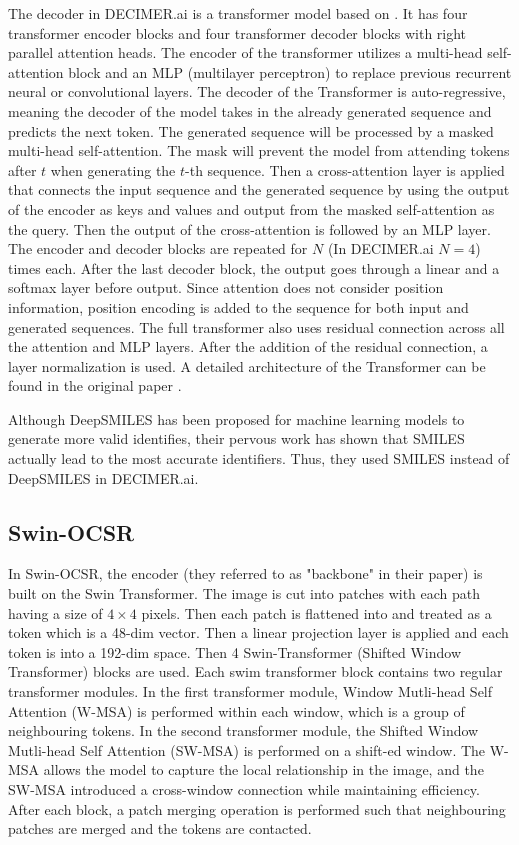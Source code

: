 \documentclass{article}
\begin{document}
The decoder in DECIMER.ai is a transformer model based on \autocite{attention_is_all_you_need}. It has four transformer encoder blocks and four transformer decoder blocks with right parallel attention heads. \autocite{decimer} The encoder of the transformer utilizes a multi-head self-attention block and an MLP (multilayer perceptron) to replace previous recurrent neural or convolutional layers. The decoder of the Transformer is auto-regressive, meaning the decoder of the model takes in the already generated sequence and predicts the next token. The generated sequence will be processed by a masked multi-head self-attention. The mask will prevent the model from attending tokens after $t$ when generating the $t$-th sequence. Then a cross-attention layer is applied that connects the input sequence and the generated sequence by using the output of the encoder as keys and values and output from the masked self-attention as the query. Then the output of the cross-attention is followed by an MLP layer. The encoder and decoder blocks are repeated for $N$ (In DECIMER.ai $N=4$) times each. After the last decoder block, the output goes through a linear and a softmax layer before output. Since attention does not consider position information, position encoding is added to the sequence for both input and generated sequences. The full transformer also uses residual connection across all the attention and MLP layers. After the addition of the residual connection, a layer normalization is used. A detailed architecture of the Transformer can be found in the original paper \autocite{attention_is_all_you_need}. 

Although DeepSMILES \cite{oboyle_deepsmiles:_2018} has been proposed for machine learning models to generate more valid identifies, their pervous work \cite{rajan_performance_2022} has shown that SMILES actually lead to the most accurate identifiers. Thus, they used SMILES instead of DeepSMILES in DECIMER.ai. \cite{decimer}  
\subsection{Swin-OCSR}
In Swin-OCSR, the encoder (they referred to as "backbone" in their paper) is built on the Swin Transformer. The image is cut into patches with each path having a size of $4 \times 4$ pixels. Then each patch is flattened into and treated as a token which is a 48-dim vector. Then a linear projection layer is applied and each token is into a 192-dim space. 
Then 4 Swin-Transformer (Shifted Window Transformer) \autocite{swin_tran} blocks are used. Each swim transformer block contains two regular transformer modules. In the first transformer module, Window Mutli-head Self Attention (W-MSA) is performed within each window, which is a group of neighbouring tokens. In the second transformer module, the Shifted Window Mutli-head Self Attention (SW-MSA) is performed on a shift-ed window. The W-MSA allows the model to capture the local relationship in the image, and the SW-MSA introduced a cross-window connection while maintaining efficiency. After each block, a patch merging operation is performed such that neighbouring patches are merged and the tokens are contacted. \autocite{swin_tran} \autocite{swinocsr}
\end{document}

